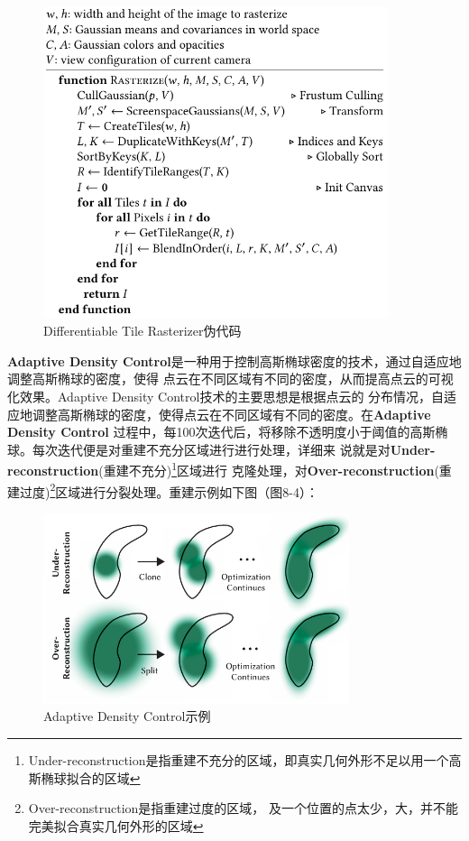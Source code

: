 \documentclass{nwputhesis}
\begin{document}
\begin{figure}[H]
    \centering
    \includegraphics[width=0.9\textwidth]{picture/29.png}
    \caption{Differentiable Tile Rasterizer伪代码}
\end{figure}

\indent
\textbf{Adaptive Density Control}是一种用于控制高斯椭球密度的技术，通过自适应地调整高斯椭球的密度，使得
点云在不同区域有不同的密度，从而提高点云的可视化效果。Adaptive Density Control技术的主要思想是根据点云的
分布情况，自适应地调整高斯椭球的密度，使得点云在不同区域有不同的密度。在\textbf{Adaptive Density Control}
过程中，每100次迭代后，将移除不透明度小于阈值的高斯椭球。每次迭代便是对重建不充分区域进行进行处理，详细来
说就是对\textbf{Under-reconstruction}(重建不充分)\footnote{
Under-reconstruction是指重建不充分的区域，即真实几何外形不足以用一个高斯椭球拟合的区域}区域进行
克隆处理，对\textbf{Over-reconstruction}(重建过度)\footnote{Over-reconstruction是指重建过度的区域，
及一个位置的点太少，大，并不能完美拟合真实几何外形的区域}区域进行分裂处理。重建示例如下图（图8-4）：
\begin{figure}[H]
    \centering
    \includegraphics[width=0.8\textwidth]{picture/30.png}
    \caption{Adaptive Density Control示例}
\end{figure}
\end{document}
